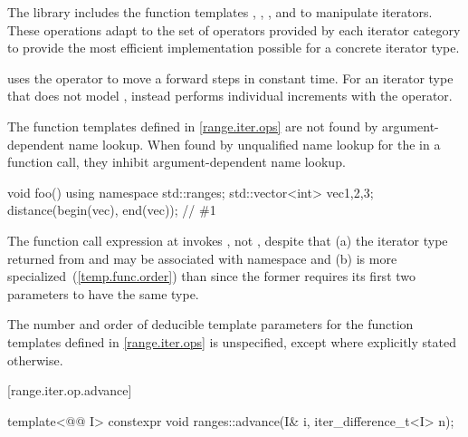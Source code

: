 \pnum
The library includes the function templates
, ,
, and 
to manipulate iterators. These operations adapt to the set of operators
provided by each iterator category to provide the most efficient implementation
possible for a concrete iterator type.
\begin{example}
 uses the \tcode{+} operator to move a
 forward  steps in constant time.
For an iterator type that does not model ,
 instead performs  individual increments with
the \tcode{++} operator.
\end{example}

\pnum
The function templates defined in \ref{range.iter.ops} are not found by
argument-dependent name lookup. When found by
unqualified name lookup for the
 in a function call, they
inhibit argument-dependent name lookup.

\begin{example}
\begin{codeblock}
void foo() {
    using namespace std::ranges;
    std::vector<int> vec{1,2,3};
    distance(begin(vec), end(vec));     // \#1
}
\end{codeblock}
The function call expression at  invokes ,
not , despite that
(a) the iterator type returned from  and 
may be associated with namespace  and
(b)  is more specialized~(\ref{temp.func.order}) than
 since the former requires its first two parameters
to have the same type.
\end{example}

\pnum
The number and order of deducible template parameters for the function templates defined
in \ref{range.iter.ops} is unspecified, except where explicitly stated otherwise.

[range.iter.op.advance]{}

%
\begin{itemdecl}
template<@@ I>
  constexpr void ranges::advance(I& i, iter_difference_t<I> n);
\end{itemdecl}


